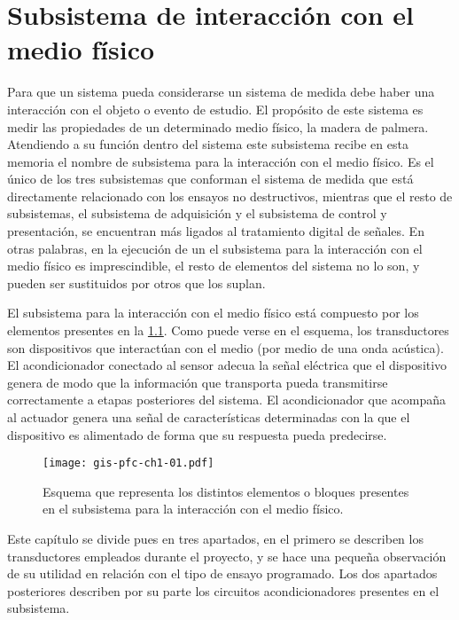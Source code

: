 \chapter{Subsistema de interacción con el medio físico}

Para que un sistema pueda considerarse un sistema de medida debe haber una
interacción con el objeto o evento de estudio. El propósito de este sistema
es medir las propiedades de un determinado medio físico, la madera de
palmera. Atendiendo a su función dentro del sistema este subsistema recibe
en esta memoria el nombre de subsistema para la interacción con el medio
físico. Es el único de los tres subsistemas que conforman el sistema de
medida que está directamente relacionado con los ensayos no destructivos,
mientras que el resto de subsistemas, el subsistema de adquisición y el
subsistema de control y presentación, se encuentran más ligados al
tratamiento digital de señales. En otras palabras, en la ejecución de un
 el subsistema para la interacción con el medio físico es
imprescindible, el resto de elementos del sistema no lo son, y pueden ser
sustituidos por otros que los suplan.

El subsistema para la interacción con el medio físico está compuesto por
los elementos presentes en la \cref{fig:submedium}. Como puede verse en el
esquema, los transductores son dispositivos que interactúan con el medio
(por medio de una onda acústica). El acondicionador conectado al sensor
adecua la señal eléctrica que el dispositivo genera de modo que la
información que transporta pueda transmitirse correctamente a etapas
posteriores del sistema. El acondicionador que acompaña al actuador genera
una señal de características determinadas con la que el dispositivo es
alimentado de forma que su respuesta pueda predecirse.

\begin{figure}
	\begin{center}
		\texttt{[image: gis-pfc-ch1-01.pdf]}
	\end{center}
	\caption[Subsistema para la interacción del medio físico]{Esquema
	que representa los distintos elementos o bloques presentes en el
	subsistema para la interacción con el medio físico.}
	\label{fig:submedium}
\end{figure}

Este capítulo se divide pues en tres apartados, en el primero se describen
los transductores empleados durante el proyecto, y se hace una pequeña
observación de su utilidad en relación con el tipo de ensayo
programado. Los dos apartados posteriores describen por su parte los
circuitos acondicionadores presentes en el subsistema.


